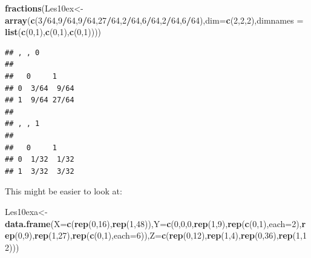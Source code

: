\documentclass[]{book}
\newenvironment{Shaded}{\begin{snugshade}}{\end{snugshade}}
\newcommand{\KeywordTok}[1]{\textcolor[rgb]{0.13,0.29,0.53}{\textbf{#1}}}
\newcommand{\DataTypeTok}[1]{\textcolor[rgb]{0.13,0.29,0.53}{#1}}
\newcommand{\DecValTok}[1]{\textcolor[rgb]{0.00,0.00,0.81}{#1}}
\newcommand{\OperatorTok}[1]{\textcolor[rgb]{0.81,0.36,0.00}{\textbf{#1}}}
\newcommand{\NormalTok}[1]{#1}
\theoremstyle{definition}
\theoremstyle{definition}
\theoremstyle{definition}
\theoremstyle{remark}
\begin{document}
\begin{Shaded}
\begin{Highlighting}[]
\KeywordTok{fractions}\NormalTok{(Les10ex<-}\KeywordTok{array}\NormalTok{(}\KeywordTok{c}\NormalTok{(}\DecValTok{3}\OperatorTok{/}\DecValTok{64}\NormalTok{,}\DecValTok{9}\OperatorTok{/}\DecValTok{64}\NormalTok{,}\DecValTok{9}\OperatorTok{/}\DecValTok{64}\NormalTok{,}\DecValTok{27}\OperatorTok{/}\DecValTok{64}\NormalTok{,}\DecValTok{2}\OperatorTok{/}\DecValTok{64}\NormalTok{,}\DecValTok{6}\OperatorTok{/}\DecValTok{64}\NormalTok{,}\DecValTok{2}\OperatorTok{/}\DecValTok{64}\NormalTok{,}\DecValTok{6}\OperatorTok{/}\DecValTok{64}\NormalTok{),}\DataTypeTok{dim=}\KeywordTok{c}\NormalTok{(}\DecValTok{2}\NormalTok{,}\DecValTok{2}\NormalTok{,}\DecValTok{2}\NormalTok{),}\DataTypeTok{dimnames =} \KeywordTok{list}\NormalTok{(}\KeywordTok{c}\NormalTok{(}\DecValTok{0}\NormalTok{,}\DecValTok{1}\NormalTok{),}\KeywordTok{c}\NormalTok{(}\DecValTok{0}\NormalTok{,}\DecValTok{1}\NormalTok{),}\KeywordTok{c}\NormalTok{(}\DecValTok{0}\NormalTok{,}\DecValTok{1}\NormalTok{))))}
\end{Highlighting}
\end{Shaded}

\begin{verbatim}
## , , 0
## 
##   0     1    
## 0  3/64  9/64
## 1  9/64 27/64
## 
## , , 1
## 
##   0     1    
## 0  1/32  1/32
## 1  3/32  3/32
\end{verbatim}

This might be easier to look at:

\begin{Shaded}
\begin{Highlighting}[]
\NormalTok{Les10exa<-}\KeywordTok{data.frame}\NormalTok{(}\DataTypeTok{X=}\KeywordTok{c}\NormalTok{(}\KeywordTok{rep}\NormalTok{(}\DecValTok{0}\NormalTok{,}\DecValTok{16}\NormalTok{),}\KeywordTok{rep}\NormalTok{(}\DecValTok{1}\NormalTok{,}\DecValTok{48}\NormalTok{)),}\DataTypeTok{Y=}\KeywordTok{c}\NormalTok{(}\DecValTok{0}\NormalTok{,}\DecValTok{0}\NormalTok{,}\DecValTok{0}\NormalTok{,}\KeywordTok{rep}\NormalTok{(}\DecValTok{1}\NormalTok{,}\DecValTok{9}\NormalTok{),}\KeywordTok{rep}\NormalTok{(}\KeywordTok{c}\NormalTok{(}\DecValTok{0}\NormalTok{,}\DecValTok{1}\NormalTok{),}\DataTypeTok{each=}\DecValTok{2}\NormalTok{),}\KeywordTok{rep}\NormalTok{(}\DecValTok{0}\NormalTok{,}\DecValTok{9}\NormalTok{),}\KeywordTok{rep}\NormalTok{(}\DecValTok{1}\NormalTok{,}\DecValTok{27}\NormalTok{),}\KeywordTok{rep}\NormalTok{(}\KeywordTok{c}\NormalTok{(}\DecValTok{0}\NormalTok{,}\DecValTok{1}\NormalTok{),}\DataTypeTok{each=}\DecValTok{6}\NormalTok{)),}\DataTypeTok{Z=}\KeywordTok{c}\NormalTok{(}\KeywordTok{rep}\NormalTok{(}\DecValTok{0}\NormalTok{,}\DecValTok{12}\NormalTok{),}\KeywordTok{rep}\NormalTok{(}\DecValTok{1}\NormalTok{,}\DecValTok{4}\NormalTok{),}\KeywordTok{rep}\NormalTok{(}\DecValTok{0}\NormalTok{,}\DecValTok{36}\NormalTok{),}\KeywordTok{rep}\NormalTok{(}\DecValTok{1}\NormalTok{,}\DecValTok{12}\NormalTok{)))}
\end{Highlighting}
\end{Shaded}
\end{document}
